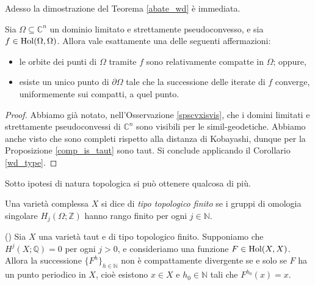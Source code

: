 Adesso la dimostrazione del Teorema \ref{abate_wd} è immediata.

\begin{cor}
    Sia $\Omega \subseteq \mathbb{C}^n$ un dominio limitato e strettamente pseudoconvesso, e sia $f \in \textnormal{Hol}(\Omega,\Omega)$. Allora vale esattamente una delle seguenti affermazioni:
    \begin{itemize}
        \item le orbite dei punti di $\Omega$ tramite $f$ sono relativamente compatte in $\Omega$; oppure,
        \item esiste un unico punto di $\partial\Omega$ tale che la successione delle iterate di $f$ converge, uniformemente sui compatti, a quel punto.
    \end{itemize}
\end{cor}

\begin{proof}
    Abbiamo già notato, nell'Osservazione \ref{spscvxisvis}, che i domini limitati e strettamente pseudoconvessi di $\mathbb{C}^n$ sono visibili per le simil-geodetiche. Abbiamo anche visto che sono completi rispetto alla distanza di Kobayashi, dunque per la Proposizione \ref{comp_is_taut} sono taut. Si conclude applicando il Corollario \ref{wd_type}.
\end{proof}

Sotto ipotesi di natura topologica si può ottenere qualcosa di più.

\begin{defn}
    Una varietà complessa $X$ si dice di \textit{tipo topologico finito} se i gruppi di omologia singolare $H_j(\Omega;\mathbb{Z})$ hanno rango finito per ogni $j\in\mathbb{N}$.
\end{defn}

\begin{thm} \label{periodico}
    (\cite[Theorem 0.4]{A2}) Sia $X$ una varietà taut e di tipo topologico finito. Supponiamo che $H^j(X;\mathbb{Q})=0$ per ogni $j>0$, e consideriamo una funzione $F\in\textnormal{Hol}(X,X)$. Allora la successione $\{F^h\}_{h\in\mathbb{N}}$ non è compattamente divergente se e solo se $F$ ha un punto periodico in $X$, cioè esistono $x\in X$ e $h_0\in\mathbb{N}$ tali che $F^{h_0}(x)=x$.
\end{thm}

